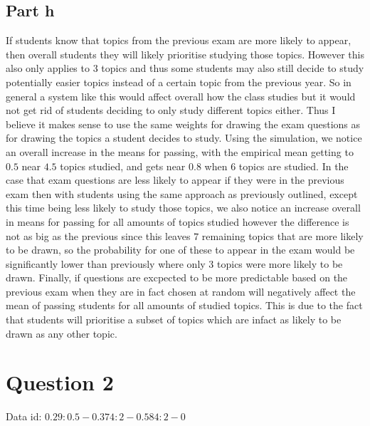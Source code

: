\documentclass[10pt]{article}
\begin{document}
\subsection*{Part h}
If students know that topics from the previous exam are more likely to appear, then overall students
they will likely prioritise studying those topics. However this also only applies to 3 topics and thus
some students may also still decide to study potentially easier topics instead of a certain topic 
from the previous year. So in general a system like this would affect overall how the class studies but
it would not get rid of students deciding to only study different topics either. Thus I believe it makes sense to 
use the same weights for drawing the exam questions as for drawing the topics a student decides to study.
Using the simulation, we notice an overall increase in the means for passing, with the empirical mean getting to $0.5$
near $4.5$ topics studied, and gets near $0.8$ when $6$ topics are studied. In the case that exam  questions are less likely to appear if they were in the previous exam then with students using
the same approach as previously outlined, except this time being less likely to study those topics, we also notice
an increase overall in means for passing for all amounts of topics studied however the difference is not as big as the previous
since this leaves $7$ remaining topics that are more likely to be drawn, so the probability for one of these to appear in the
exam would be significantly lower than previously where only 3 topics were more likely to be drawn.
Finally, if questions are excpected to be more predictable based on the previous exam when they are in fact 
chosen at random will negatively affect the mean of passing students for all amounts of studied topics. This is 
due to the fact that students will prioritise a subset of topics which are infact as likely to be drawn as 
any other topic.


\section*{Question 2}
Data id: $0.29:0.5-0.374:2-0.584:2-0$
\end{document}
